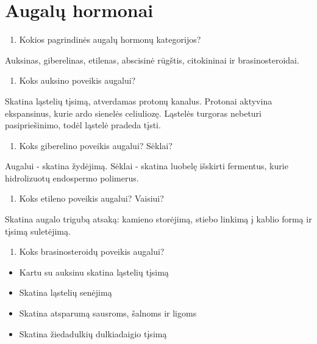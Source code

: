 \documentclass[]{book}
\providecommand{\tightlist}{%
  \setlength{\itemsep}{0pt}\setlength{\parskip}{0pt}}
\begin{document}
\hypertarget{augalu-hormonai}{%
\section{Augalų hormonai}\label{augalu-hormonai}}

\begin{enumerate}
\def\labelenumi{\arabic{enumi}.}
\tightlist
\item
  Kokios pagrindinės augalų hormonų kategorijos?
\end{enumerate}

Auksinas, giberelinas, etilenas, abscisinė rūgštis, citokininai ir brasinosteroidai.

\begin{enumerate}
\def\labelenumi{\arabic{enumi}.}
\setcounter{enumi}{1}
\tightlist
\item
  Koks auksino poveikis augalui?
\end{enumerate}

Skatina ląstelių tįsimą, atverdamas protonų kanalus. Protonai aktyvina ekspansinus, kurie ardo sienelės celiuliozę. Ląstelės turgoras nebeturi pasipriešinimo, todėl ląstelė pradeda tįsti.

\begin{enumerate}
\def\labelenumi{\arabic{enumi}.}
\setcounter{enumi}{2}
\tightlist
\item
  Koks giberelino poveikis augalui? Sėklai?
\end{enumerate}

Augalui - skatina žydėjimą. Sėklai - skatina luobelę išskirti fermentus, kurie hidrolizuotų endospermo polimerus.

\begin{enumerate}
\def\labelenumi{\arabic{enumi}.}
\setcounter{enumi}{3}
\tightlist
\item
  Koks etileno poveikis augalui? Vaisiui?
\end{enumerate}

Skatina augalo trigubą atsaką: kamieno storėjimą, stiebo linkimą į kablio formą ir tįsimą suletėjimą.

\begin{enumerate}
\def\labelenumi{\arabic{enumi}.}
\setcounter{enumi}{4}
\tightlist
\item
  Koks brasinosteroidų poveikis augalui?
\end{enumerate}

\begin{itemize}
\tightlist
\item
  Kartu su auksinu skatina ląstelių tįsimą
\item
  Skatina ląstelių senėjimą
\item
  Skatina atsparumą sausroms, šalnoms ir ligoms
\item
  Skatina žiedadulkių dulkiadaigio tįsimą
\end{itemize}
\end{document}
